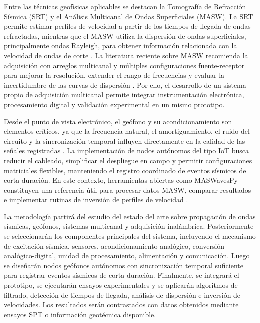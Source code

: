 \documentclass[11pt,a4paper]{article}
\begin{document}
Entre las t\'ecnicas geof\'isicas aplicables se destacan la Tomograf\'ia de Refracci\'on S\'ismica (SRT) y el An\'alisis Multicanal de Ondas Superficiales (MASW). La SRT permite estimar perfiles de velocidad a partir de los tiempos de llegada de ondas refractadas, mientras que el MASW utiliza la dispersi\'on de ondas superficiales, principalmente ondas Rayleigh, para obtener informaci\'on relacionada con la velocidad de ondas de corte \cite{Park1999,Xia1999,Foti2014}. La literatura reciente sobre MASW recomienda la adquisici\'on con arreglos multicanal y m\'ultiples configuraciones fuente-receptor para mejorar la resoluci\'on, extender el rango de frecuencias y evaluar la incertidumbre de las curvas de dispersi\'on \cite{Foti2018,OlafsdottirNGM2024}. Por ello, el desarrollo de un sistema propio de adquisici\'on multicanal permite integrar instrumentaci\'on electr\'onica, procesamiento digital y validaci\'on experimental en un mismo prototipo.

Desde el punto de vista electr\'onico, el ge\'ofono y su acondicionamiento son elementos cr\'iticos, ya que la frecuencia natural, el amortiguamiento, el ruido del circuito y la sincronizaci\'on temporal influyen directamente en la calidad de las se\~nales registradas \cite{Ma2023,Olafsdottir2018}. La implementaci\'on de nodos aut\'onomos del tipo IoT busca reducir el cableado, simplificar el despliegue en campo y permitir configuraciones matriciales flexibles, manteniendo el registro coordinado de eventos s\'ismicos de corta duraci\'on. En este contexto, herramientas abiertas como MASWavesPy constituyen una referencia \'util para procesar datos MASW, comparar resultados e implementar rutinas de inversi\'on de perfiles de velocidad \cite{Olafsdottir2020,OlafsdottirNGM2024}.

La metodolog\'ia partir\'a del estudio del estado del arte sobre propagaci\'on de ondas s\'ismicas, ge\'ofonos, sistemas multicanal y adquisici\'on inal\'ambrica. Posteriormente se seleccionar\'an los componentes principales del sistema, incluyendo el mecanismo de excitaci\'on s\'ismica, sensores, acondicionamiento anal\'ogico, conversi\'on anal\'ogico-digital, unidad de procesamiento, alimentaci\'on y comunicaci\'on. Luego se dise\~nar\'an nodos ge\'ofonos aut\'onomos con sincronizaci\'on temporal suficiente para registrar eventos s\'ismicos de corta duraci\'on. Finalmente, se integrar\'a el prototipo, se ejecutar\'an ensayos experimentales y se aplicar\'an algoritmos de filtrado, detecci\'on de tiempos de llegada, an\'alisis de dispersi\'on e inversi\'on de velocidades. Los resultados ser\'an contrastados con datos obtenidos mediante ensayos SPT o informaci\'on geot\'ecnica disponible.
\end{document}

